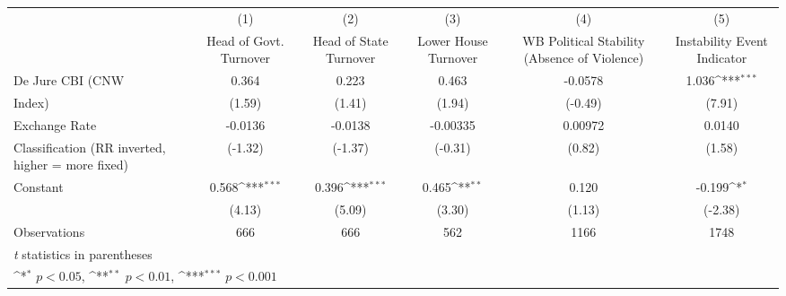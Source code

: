 {
\def\sym#1{\ifmmode^{#1}\else\(^{#1}\)\fi}
\begin{tabular}{l*{5}{c}}
\hline\hline
                    &\multicolumn{1}{c}{(1)}&\multicolumn{1}{c}{(2)}&\multicolumn{1}{c}{(3)}&\multicolumn{1}{c}{(4)}&\multicolumn{1}{c}{(5)}\\
                    &\multicolumn{1}{c}{Head of Govt. Turnover}&\multicolumn{1}{c}{Head of State Turnover}&\multicolumn{1}{c}{Lower House Turnover}&\multicolumn{1}{c}{WB Political Stability (Absence of Violence)}&\multicolumn{1}{c}{Instability Event Indicator}\\
\hline
De Jure CBI (CNW    &       0.364         &       0.223         &       0.463         &     -0.0578         &       1.036\sym{***}\\
Index)              &      (1.59)         &      (1.41)         &      (1.94)         &     (-0.49)         &      (7.91)         \\
[1em]
Exchange Rate       &     -0.0136         &     -0.0138         &    -0.00335         &     0.00972         &      0.0140         \\
Classification (RR inverted, higher = more fixed)&     (-1.32)         &     (-1.37)         &     (-0.31)         &      (0.82)         &      (1.58)         \\
[1em]
Constant            &       0.568\sym{***}&       0.396\sym{***}&       0.465\sym{**} &       0.120         &      -0.199\sym{*}  \\
                    &      (4.13)         &      (5.09)         &      (3.30)         &      (1.13)         &     (-2.38)         \\
\hline
Observations        &         666         &         666         &         562         &        1166         &        1748         \\
\hline\hline
\multicolumn{6}{l}{\footnotesize \textit{t} statistics in parentheses}\\
\multicolumn{6}{l}{\footnotesize \sym{*} \(p<0.05\), \sym{**} \(p<0.01\), \sym{***} \(p<0.001\)}\\
\end{tabular}
}
